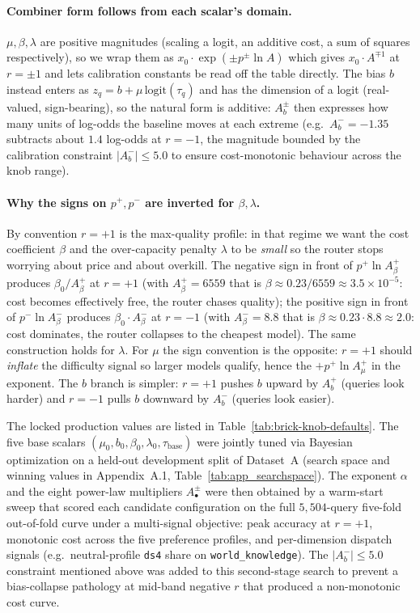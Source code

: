 \documentclass[twocolumn,10pt,a4paper]{article}
\begin{document}
\paragraph{Combiner form follows from each scalar's domain.} $\mu, \beta, \lambda$ are positive magnitudes (scaling a logit, an additive cost, a sum of squares respectively), so we wrap them as $x_0\cdot\exp(\pm p^{\pm}\ln A)$ which gives $x_0\cdot A^{\mp 1}$ at $r{=}{\pm 1}$ and lets calibration constants be read off the table directly. The bias $b$ instead enters as $z_q = b + \mu\,\mathrm{logit}(\tau_q)$ and has the dimension of a logit (real-valued, sign-bearing), so the natural form is additive: $A_b^{\pm}$ then expresses how many units of log-odds the baseline moves at each extreme (e.g.\ $A_b^{-}{=}{-}1.35$ subtracts about $1.4$ log-odds at $r{=}{-1}$, the magnitude bounded by the calibration constraint $|A_b^{-}|{\le}5.0$ to ensure cost-monotonic behaviour across the knob range).

\paragraph{Why the signs on $p^{+}, p^{-}$ are inverted for $\beta, \lambda$.} By convention $r{=}{+1}$ is the max-quality profile: in that regime we want the cost coefficient $\beta$ and the over-capacity penalty $\lambda$ to be \emph{small} so the router stops worrying about price and about overkill. The negative sign in front of $p^{+}\ln A_{\beta}^{+}$ produces $\beta_0 / A_{\beta}^{+}$ at $r{=}{+1}$ (with $A_{\beta}^{+}{=}6559$ that is $\beta \approx 0.23 / 6559 \approx 3.5{\times}10^{-5}$: cost becomes effectively free, the router chases quality); the positive sign in front of $p^{-}\ln A_{\beta}^{-}$ produces $\beta_0 \cdot A_{\beta}^{-}$ at $r{=}{-1}$ (with $A_{\beta}^{-}{=}8.8$ that is $\beta \approx 0.23 \cdot 8.8 \approx 2.0$: cost dominates, the router collapses to the cheapest model). The same construction holds for $\lambda$. For $\mu$ the sign convention is the opposite: $r{=}{+1}$ should \emph{inflate} the difficulty signal so larger models qualify, hence the $+p^{+}\ln A_{\mu}^{+}$ in the exponent. The $b$ branch is simpler: $r{=}{+1}$ pushes $b$ upward by $A_b^{+}$ (queries look harder) and $r{=}{-1}$ pulls $b$ downward by $A_b^{-}$ (queries look easier).

The locked production values are listed in Table~\ref{tab:brick-knob-defaults}. The five base scalars $(\mu_0, b_0, \beta_0, \lambda_0, \tau_\text{base})$ were jointly tuned via Bayesian optimization on a held-out development split of Dataset~A (search space and winning values in Appendix~A.1, Table~\ref{tab:app_searchspace}). The exponent $\alpha$ and the eight power-law multipliers $A_{\bullet}^{\pm}$ were then obtained by a warm-start sweep that scored each candidate configuration on the full $5{,}504$-query five-fold out-of-fold curve under a multi-signal objective: peak accuracy at $r{=}{+}1$, monotonic cost across the five preference profiles, and per-dimension dispatch signals (e.g.\ neutral-profile \texttt{ds4} share on \texttt{world\_knowledge}). The $|A_b^{-}|{\le}5.0$ constraint mentioned above was added to this second-stage search to prevent a bias-collapse pathology at mid-band negative $r$ that produced a non-monotonic cost curve.
\end{document}
